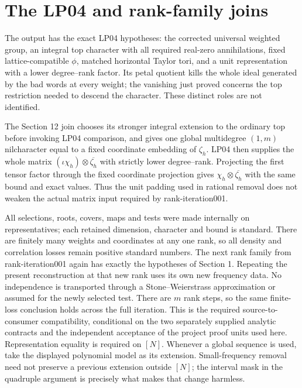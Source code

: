 \documentclass[11pt]{article}
\begin{document}
\section{The LP04 and rank-family joins}
The output has the exact LP04 hypotheses: the corrected universal weighted
group, an integral top character with all required real-zero annihilations,
fixed lattice-compatible $\phi$, matched horizontal Taylor tori, and a unit
representation with a lower degree--rank factor. Its petal quotient kills
the whole ideal generated by the bad words at every weight; the vanishing
just proved concerns the top restriction needed to descend the character.
These distinct roles are not identified.

The Section 12 join chooses its stronger integral extension to the ordinary
top before invoking LP04 comparison, and gives one global multidegree
$(1,m)$ nilcharacter equal to a fixed coordinate embedding of $\zeta_h$.
LP04 then supplies the whole matrix
$(\iota\chi_h)\otimes\overline{\zeta_h}$ with strictly lower degree--rank.
Projecting the first tensor factor through the fixed coordinate projection
gives $\chi_h\otimes\overline{\zeta_h}$ with the same bound and exact values.
Thus the unit padding used in rational removal does not weaken the actual
matrix input required by rank-iteration001.

All selections, roots, covers, maps and tests were made internally on
representatives; each retained dimension, character and bound is standard.
There are finitely many weights and coordinates at any one rank, so all
density and correlation losses remain positive standard numbers. The next
rank family from rank-iteration001 again has exactly the hypotheses of
Section 1. Repeating the present reconstruction at that new rank uses its
own new frequency data. No independence is transported through a
Stone--Weierstrass approximation or assumed for the newly selected test.
There are $m$ rank steps, so the same finite-loss conclusion holds across
the full iteration. This is the required source-to-consumer compatibility,
conditional on the two separately supplied analytic contracts and the
independent acceptance of the project proof units used here.
Representation equality is required on $[N]$. Whenever a global sequence
is used, take the displayed polynomial model as its extension. Small-frequency
removal need not preserve a previous extension outside $[N]$; the interval
mask in the quadruple argument is precisely what makes that change harmless.
\end{document}
